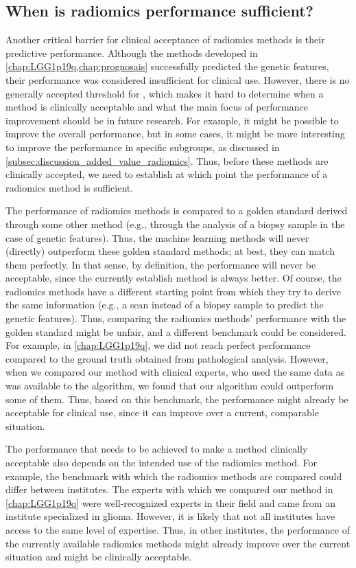 \subsection{When is radiomics performance sufficient?}\label{subsec:discussion_radiomics_performance}

Another critical barrier for clinical acceptance of radiomics methods is their predictive performance.
Although the methods developed in \cref{chap:LGG1p19q,chap:prognosais} successfully predicted the genetic features, their performance was considered insufficient for clinical use.
However, there is no generally accepted threshold for , which makes it hard to determine when a method is clinically acceptable and what the main focus of performance improvement should be in future research.
For example, it might be possible to improve the overall performance, but in some cases, it might be more interesting to improve the performance in specific subgroups, as discussed in \cref{subsec:discussion_added_value_radiomics}.
Thus, before these methods are clinically accepted, we need to establish at which point the performance of a radiomics method is sufficient.

The performance of radiomics methods is compared to a golden standard derived through some other method (e.g., through the analysis of a biopsy sample in the case of genetic features).
Thus, the machine learning methods will never (directly) outperform these golden standard methods; at best, they can match them perfectly.
In that sense, by definition, the performance will never be acceptable, since the currently establish method is always better.
Of course, the radiomics methods have a different starting point from which they try to derive the same information (e.g., a scan instead of a biopsy sample to predict the genetic features).
Thus, comparing the radiomics methods' performance with the golden standard might be unfair, and a different benchmark could be considered.
For example, in \cref{chap:LGG1p19q}, we did not reach perfect performance compared to the ground truth obtained from pathological analysis.
However, when we compared our method with clinical experts, who used the same data as was available to the algorithm, we found that our algorithm could outperform some of them.
Thus, based on this benchmark, the performance might already be acceptable for clinical use, since it can improve over a current, comparable situation.

The performance that needs to be achieved to make a method clinically acceptable also depends on the intended use of the radiomics method.
For example, the benchmark with which the radiomics methods are compared could differ between institutes.
The experts with which we compared our method in \cref{chap:LGG1p19q} were well-recognized experts in their field and came from an institute specialized in glioma.
However, it is likely that not all institutes have access to the same level of expertise.
Thus, in other institutes, the performance of the currently available radiomics methods might already improve over the current situation and might be clinically acceptable.

